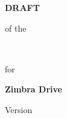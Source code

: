 \begin{center}
\begin{Huge}
\textbf{DRAFT}\\
\end{Huge}
of the\\
\begin{Huge}
\textbf{\documentTitle}\\
\end{Huge}
for\\
\begin{Huge}
\textbf{Zimbra Drive}\\
\end{Huge}
Version \version
\end{center}
